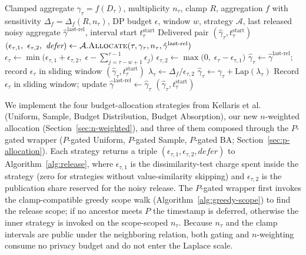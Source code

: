 \begin{algorithm}[t]
\caption{Per-element release at interval $\tau$ (wall-clock start $t_\tau^{\text{start}}$)}\label{alg:release}
\begin{algorithmic}[1]
\Require Clamped aggregate $\gamma_\tau = f(D_\tau)$, multiplicity $n_\tau$,
clamp $R$, aggregation $f$ with sensitivity $\Delta_f = \Delta_f(R, n_\tau)$,
DP budget $\epsilon$, window $w$, strategy $\mathcal{A}$, last released noisy aggregate $\hat{\gamma} ^{\text{last-rel}}$, interval start $t_\tau^{\text{start}}$
\Ensure Delivered pair $(\hat{\gamma} _\tau, t_\tau^{\text{start}})$
\State $(\epsilon_{\tau,1},\ \epsilon_{\tau,2},\ \textit{defer}) \gets \mathcal{A}.\textsc{Allocate}(\tau, \gamma_\tau, n_\tau, \hat{\gamma} ^{\text{last-rel}})$
\State $\epsilon_\tau \gets \min\!\bigl(\epsilon_{\tau,1} + \epsilon_{\tau,2},\; \epsilon - \sum_{j=\tau-w+1}^{\tau-1} \epsilon_j\bigr)$
\State $\epsilon_{\tau,2} \gets \max\!\bigl(0,\; \epsilon_\tau - \epsilon_{\tau,1}\bigr)$
  \State $\hat{\gamma} _\tau \gets \hat{\gamma} ^{\text{last-rel}}$; record $\epsilon_\tau$ in sliding window
  \State \Return $(\hat{\gamma} _\tau, t_\tau^{\text{start}})$
\EndIf
\State $\lambda_\tau \gets \Delta_f / \epsilon_{\tau,2}$ 
\State $\hat{\gamma} _\tau \gets \gamma_\tau + \mathrm{Lap}(\lambda_\tau)$
\State Record $\epsilon_\tau$ in sliding window; update $\hat{\gamma} ^{\text{last-rel}} \gets \hat{\gamma} _\tau$
\State \Return $(\hat{\gamma} _\tau, t_\tau^{\text{start}})$ 
\end{algorithmic}
\end{algorithm}


We implement the four budget-allocation strategies from Kellaris et al.~\cite{kellaris2014} (Uniform, Sample, Budget Distribution, Budget Absorption), our new $n$-weighted allocation (Section~\ref{sec:n-weighted}), and three of them composed through the $P$-gated wrapper ($P$-gated Uniform, $P$-gated Sample, $P$-gated BA; Section~\ref{sec:p-allocation}). Each strategy returns a triple $(\epsilon_{\tau,1}, \epsilon_{\tau,2}, \textit{defer})$ to Algorithm~\ref{alg:release}, where $\epsilon_{\tau,1}$ is the dissimilarity-test charge spent inside the strategy (zero for strategies without value-similarity skipping) and $\epsilon_{\tau,2}$ is the publication share reserved for the noisy release. The $P$-gated wrapper first invokes the clamp-compatible greedy scope walk (Algorithm~\ref{alg:greedy-scope}) to find the release scope; if no ancestor meets $P$ the timestamp is deferred, otherwise the inner strategy is invoked on the scope-scoped $n_\tau$. Because $n_\tau$ and the clamp intervals are public under the neighboring relation, both gating and $n$-weighting consume no privacy budget and do not enter the Laplace scale.

